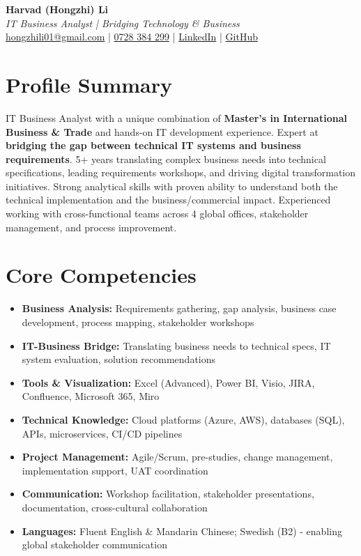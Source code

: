 \documentclass[10pt,a4paper]{article}
\begin{document}
\pagestyle{empty}

\begin{center}
{\LARGE \textbf{Harvad (Hongzhi) Li}}\\[8pt]
{\Large \textit{IT Business Analyst | Bridging Technology \& Business}}\\[8pt]
\textcolor{linkedinblue}{\href{mailto:hongzhili01@gmail.com}{hongzhili01@gmail.com} | \href{tel:0728384299}{0728 384 299} | \href{https://www.linkedin.com/in/harvad/}{LinkedIn} | \href{https://github.com/bluehawana}{GitHub}}
\end{center}
\vspace{8pt}

\section*{Profile Summary}
IT Business Analyst with a unique combination of \textbf{Master's in International Business \& Trade} and hands-on IT development experience. Expert at \textbf{bridging the gap between technical IT systems and business requirements}. 5+ years translating complex business needs into technical specifications, leading requirements workshops, and driving digital transformation initiatives. Strong analytical skills with proven ability to understand both the technical implementation and the business/commercial impact. Experienced working with cross-functional teams across 4 global offices, stakeholder management, and process improvement.

\section*{Core Competencies}
\begin{itemize}[noitemsep]
\item \textbf{Business Analysis:} Requirements gathering, gap analysis, business case development, process mapping, stakeholder workshops
\item \textbf{IT-Business Bridge:} Translating business needs to technical specs, IT system evaluation, solution recommendations
\item \textbf{Tools \& Visualization:} Excel (Advanced), Power BI, Visio, JIRA, Confluence, Microsoft 365, Miro
\item \textbf{Technical Knowledge:} Cloud platforms (Azure, AWS), databases (SQL), APIs, microservices, CI/CD pipelines
\item \textbf{Project Management:} Agile/Scrum, pre-studies, change management, implementation support, UAT coordination
\item \textbf{Communication:} Workshop facilitation, stakeholder presentations, documentation, cross-cultural collaboration
\item \textbf{Languages:} Fluent English \& Mandarin Chinese; Swedish (B2) - enabling global stakeholder communication
\end{itemize}
\end{document}
